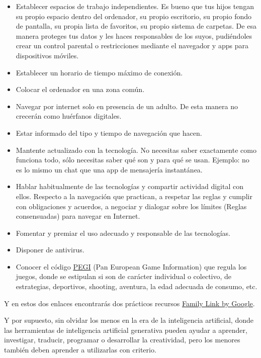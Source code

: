 \documentclass[
  spanish,
  a4paper,
  openany]{book}
\begin{document}
\begin{itemize}
\item
  Establecer espacios de trabajo independientes. Es bueno que tus hijos tengan su propio espacio dentro del ordenador, su propio escritorio, su propio fondo de pantalla, su propia lista de favoritos, su propio sistema de carpetas. De esa manera proteges tus datos y les haces responsables de los suyos, pudiéndoles crear un control parental o restricciones mediante el navegador y apps para dispositivos móviles.
\item
  Establecer un horario de tiempo máximo de conexión.
\item
  Colocar el ordenador en una zona común.
\item
  Navegar por internet solo en presencia de un adulto. De esta manera no crecerán como huérfanos digitales.
\item
  Estar informado del tipo y tiempo de navegación que hacen.
\item
  Mantente actualizado con la tecnología. No necesitas saber exactamente como funciona todo, sólo necesitas saber qué son y para qué se usan. Ejemplo: no es lo mismo un chat que una app de mensajería instantánea.
\item
  Hablar habitualmente de las tecnologías y compartir actividad digital con ellos. Respecto a la navegación que practican, a respetar las reglas y cumplir con obligaciones y acuerdos, a negociar y dialogar sobre los límites (Reglas consensuadas) para navegar en Internet.
\item
  Fomentar y premiar el uso adecuado y responsable de las tecnologías.
\item
  Disponer de antivirus.
\item
  Conocer el código \href{https://pegi.info/es}{PEGI} (Pan European Game Information) que regula los juegos, donde se estipulan si son de carácter individual o colectivo, de estrategias, deportivos, shooting, aventura, la edad adecuada de consumo, etc.
\end{itemize}

Y en estos dos enlaces encontrarás dos prácticos recursos \href{https://families.google.com/familylink/}{Family Link by Google}.

Y por supuesto, sin olvidar los menos en la era de la inteligencia artificial, donde las herramientas de inteligencia artificial generativa pueden ayudar a aprender, investigar, traducir, programar o desarrollar la creatividad, pero los menores también deben aprender a utilizarlas con criterio.
\end{document}
